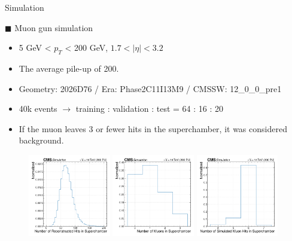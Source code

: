 \documentclass[10pt]{beamer}
\begin{document}
\begin{frame}[fragile]{Simulation}

$\blacksquare$ Muon gun simulation
\begin{itemize}
    \item 5 GeV < $p_{T}$ < 200 GeV, $1.7 < \vert\eta\vert < 3.2$
    \item The average pile-up of 200.
    \item Geometry: 2026D76 / Era: Phase2C11I13M9 / CMSSW: 12\_0\_0\_pre1
    \item 40k events $\rightarrow$ training : validation : test = 64 : 16 : 20
    \item If the muon leaves 3 or fewer hits in the superchamber, it was considered background.
\end{itemize}


\begin{figure}
    \centering
    \includegraphics[width=0.32\textwidth]{figures/data/NumHit.pdf}
    \includegraphics[width=0.32\textwidth]{figures/data/NumMuon.pdf}
    \includegraphics[width=0.32\textwidth]{figures/data/NumMuonHit.pdf}
\end{figure}

\end{frame}
\end{document}
